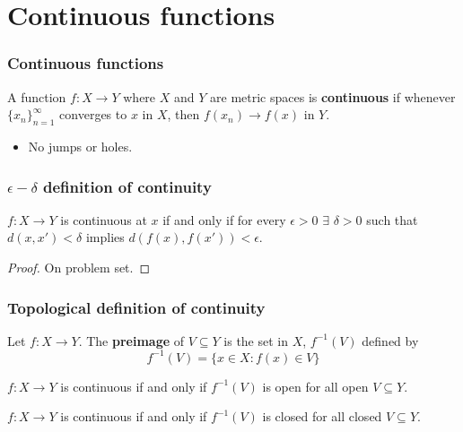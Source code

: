 \documentclass[compress]{beamer}
\newcommand{\seq}[1]{\{{#1}_n \}_{n=1}^\infty }
\renewcommand{\to}{{\rightarrow}}
\begin{document}
\section{Continuous functions}

\begin{frame}
  \frametitle{Continuous functions}
  \begin{definition}
    A function $f:X \to Y$ where $X$ and $Y$ are metric spaces is
    \textbf{continuous} if whenever $\seq{x}$ converges to $x$ in $X$,
    then $f(x_n) \to f(x)$ in $Y$. 
  \end{definition}
  \begin{itemize}
  \item No jumps or holes.
  \end{itemize}
\end{frame}

\begin{frame}[shrink]
  \frametitle{$\epsilon-\delta$ definition of continuity}
  \begin{lemma}\label{lem:ced}
    $f: X \to Y$ is continuous at $x$ if and only if for every
    $\epsilon>0$ $\exists$ $\delta >0$ such that $d(x,x') < \delta $
    implies $d(f(x),f(x')) < \epsilon$.
  \end{lemma}
  \begin{proof}
    On problem set.
  \end{proof}
\end{frame}

\begin{frame}[shrink]
  \frametitle{Topological definition of continuity}
  \begin{definition}
    Let $f: X \to Y$. The \textbf{preimage} of $V \subseteq Y$ is the
    set in $X$, $f^{-1}(V)$ defined by
    \[ f^{-1} (V) = \{ x \in X: f(x) \in V \} \]
  \end{definition}
  
  \begin{lemma}\label{lem:copen}
    $f:X \to Y$ is continuous if and only if $f^{-1}(V)$ is open for all
    open $V \subseteq Y$. 
  \end{lemma}

  \begin{corollary}
    $f:X \to Y$ is continuous if and only if $f^{-1}(V)$ is closed for all
    closed $V \subseteq Y$. 
  \end{corollary}
\end{frame}
\end{document}
